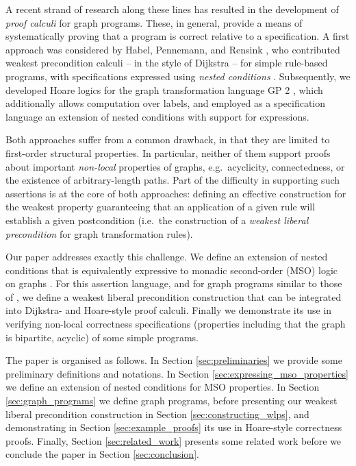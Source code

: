 \documentclass{llncs}
\begin{document}
	A recent strand of research along these lines has resulted in the development of \emph{proof calculi} for graph programs. These, in general, provide a means of systematically proving that a program is correct relative to a specification. A first approach was considered by Habel, Pennemann, and Rensink \cite{Habel-Pennemann-Rensink06a,Pennemann09a}, who contributed weakest precondition calculi -- in the style of Dijkstra -- for simple rule-based programs, with specifications expressed using \emph{nested conditions} \cite{Habel-Pennemann09a}. Subsequently, we developed Hoare logics \cite{Poskitt-Plump12a,Poskitt13a} for the graph transformation language GP 2 \cite{Plump12a}, which additionally allows computation over labels, and employed as a specification language an extension of nested conditions with support for expressions.
	
	Both approaches suffer from a common drawback, in that they are limited to first-order structural properties. In particular, neither of them support proofs about important \emph{non-local} properties of graphs, e.g.\ acyclicity, connectedness, or the existence of arbitrary-length paths. Part of the difficulty in supporting such assertions is at the core of both approaches: defining an effective construction for the weakest property guaranteeing that an application of a given rule will establish a given postcondition (i.e.\ the construction of a \emph{weakest liberal precondition} for graph transformation rules).
	
	Our paper addresses exactly this challenge. We define an extension of nested conditions that is equivalently expressive to monadic second-order (MSO) logic on graphs \cite{Courcelle-Engelfriet12a}. For this assertion language, and for graph programs similar to those of \cite{Habel-Pennemann-Rensink06a,Pennemann09a}, we define a weakest liberal precondition construction that can be integrated into Dijkstra- and Hoare-style proof calculi. Finally we demonstrate its use in verifying non-local correctness specifications (properties including that the graph is bipartite, acyclic) of some simple programs.
	
	The paper is organised as follows. In Section \ref{sec:preliminaries} we provide some preliminary definitions and notations. In Section \ref{sec:expressing_mso_properties} we define an extension of nested conditions for MSO properties. In Section \ref{sec:graph_programs} we define graph programs, before presenting our weakest liberal precondition construction in Section \ref{sec:constructing_wlps}, and demonstrating in Section \ref{sec:example_proofs} its use in Hoare-style correctness proofs. Finally, Section \ref{sec:related_work} presents some related work before we conclude the paper in Section \ref{sec:conclusion}.
	
\end{document}
